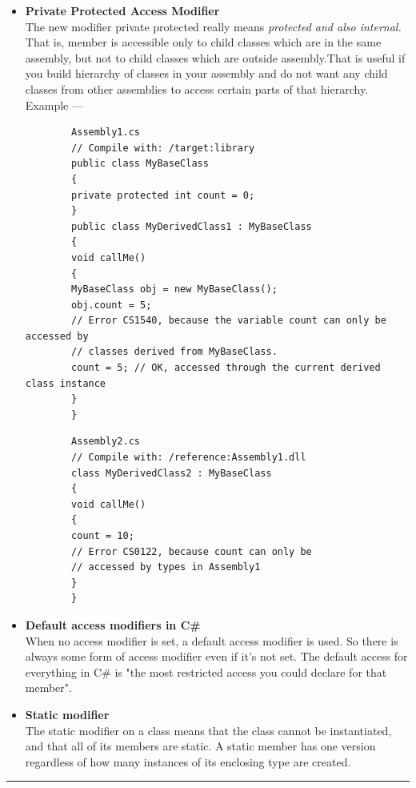 \documentclass[11pt,dvipsnames,cmyk]{article}
\begin{document}
\begin{itemize}
	 	\item \textbf{Private Protected Access Modifier}
	 	\\The new modifier private protected really means \emph{protected and also internal.} That is, member is accessible only to child classes which are in the same assembly, but not to child classes which are outside assembly.That is useful if you build hierarchy of classes in your assembly and do not want any child classes from other assemblies to access certain parts of that hierarchy.
	 	\\Example ---\\
	 	\begin{verbatim}
	 	Assembly1.cs
	 	// Compile with: /target:library
	 	public class MyBaseClass
	 	{
	 	private protected int count = 0;
	 	}
	 	public class MyDerivedClass1 : MyBaseClass
	 	{
	 	void callMe()
	 	{
	 	MyBaseClass obj = new MyBaseClass();
	 	obj.count = 5;
	 	// Error CS1540, because the variable count can only be accessed by
	 	// classes derived from MyBaseClass.
	 	count = 5; // OK, accessed through the current derived class instance
	 	}
	 	}
	 	\end{verbatim}
	 	\begin{verbatim}
	 	Assembly2.cs
	 	// Compile with: /reference:Assembly1.dll
	 	class MyDerivedClass2 : MyBaseClass
	 	{
	 	void callMe()
	 	{
	 	count = 10;
	 	// Error CS0122, because count can only be
	 	// accessed by types in Assembly1
	 	}
	 	}
	 	\end{verbatim}
	 	
	 	\item \textbf{Default access modifiers in C\#}
	 	\\When no access modifier is set, a default access modifier is used. So there is always some form of access modifier even if it's not set. The default access for everything in C\# is "the most restricted access you could declare for that member".
	 	
	 	\item \textbf{Static modifier}
	 	\\The static modifier on a class means that the class cannot be instantiated, and that all of its members are static. A static member has one version regardless of how many instances of its enclosing type are created.
	 	
	 \end{itemize}
	 \rule{6.27in}{1.2pt}
	 
\end{document}
